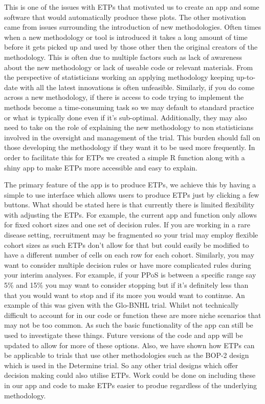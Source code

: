 This is one of the issues with ETPs that motivated us to create an app and some software that would automatically produce these plots. The other motivation came from issues surrounding the introduction of new methodologies. Often times when a new methodology or tool is introduced it takes a long amount of time before it gets picked up and used by those other then the original creators of the methodology. This is often due to multiple factors such as lack of awareness about the new methodology or lack of useable code or relevant materials. From the perspective of statisticians working an applying methodology keeping up-to-date with all the latest innovations is often unfeasible. Similarly, if you do come across a new methodology, if there is access to code trying to implement the methods become a time-consuming task so we may default to standard practice or what is typically done even if it's sub-optimal. Additionally, they may also need to take on the role of explaining the new methodology to non statisticians involved in the oversight and management of the trial. This burden should fall on those developing the methodology if they want it to be used more frequently. In order to facilitate this for ETPs we created a simple R function along with a shiny app to make ETPs more accessible and easy to explain. 

The primary feature of the app is to produce ETPs, we achieve this by having a simple to use interface which allows users to produce ETPs just by clicking a few buttons. What should be stated here is that currently there is limited flexibility with adjusting the ETPs. For example, the current app and function only allows for fixed cohort sizes and one set of decision rules. If you are working in a rare disease setting, recruitment may be fragmented so your trial may employ flexible cohort sizes as such ETPs don't allow for that but could easily be modified to have a different number of cells on each row for each cohort. Similarly, you may want to consider multiple decision rules or have more complicated rules during your interim analyses. For example, if your PPoS is between a specific range say 5\% and 15\% you may want to consider stopping but if it's definitely less than that you would want to stop and if its more you would want to continue. An example of this was given with the Glo-BNHL trial. Whilst not technically difficult to account for in our code or function these are more niche scenarios that may not be too common. As such the basic functionality of the app can still be used to investigate these things. Future versions of the code and app will be updated to allow for more of these options. Also, we have shown how ETPs can be applicable to trials that use other methodologies such as the BOP-2 design which is used in the Determine trial. So any other trial designs which offer decision making could also utilise ETPs. Work could be done on including these in our app and code to make ETPs easier to produe regardless of the underlying methodology. 

